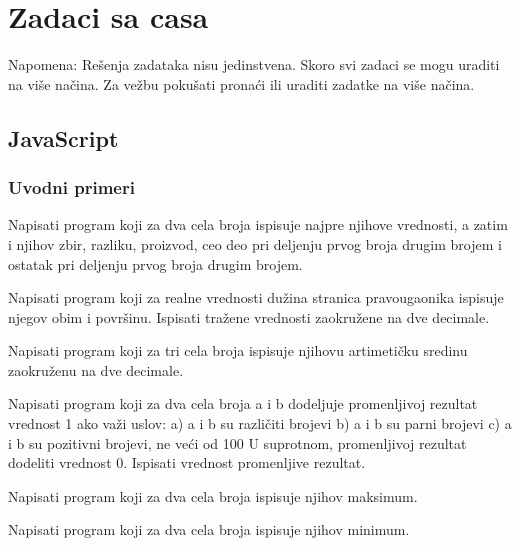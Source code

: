 \section{Zadaci sa casa}
Napomena: Rešenja zadataka nisu jedinstvena. Skoro svi zadaci se mogu uraditi na više načina. Za vežbu pokušati pronaći ili uraditi zadatke na više načina. 

\subsection{JavaScript}

\subsubsection{Uvodni primeri}
\begin{primer}
Napisati program koji za dva cela broja ispisuje najpre
njihove vrednosti, a zatim i njihov zbir, razliku, proizvod, ceo deo pri deljenju
prvog broja drugim brojem i ostatak pri deljenju prvog broja drugim brojem. 
\end{primer}


\begin{primer}
Napisati program koji za realne vrednosti dužina
stranica pravougaonika ispisuje njegov obim i površinu. Ispisati tražene vrednosti
zaokružene na dve decimale. 
\end{primer}

\begin{primer}
Napisati program koji za tri cela broja ispisuje
njihovu artimetičku sredinu zaokruženu na dve decimale.
\end{primer}

\begin{primer}
Napisati program koji za dva cela broja a i b dodeljuje
promenljivoj rezultat vrednost 1 ako važi uslov:
a) a i b su različiti brojevi
b) a i b su parni brojevi
c) a i b su pozitivni brojevi, ne veći od 100
U suprotnom, promenljivoj rezultat dodeliti vrednost 0. Ispisati vrednost promenljive
rezultat.
\end{primer}

\begin{primer}
Napisati program koji za dva cela broja ispisuje
njihov maksimum.
\end{primer}

\begin{primer}
Napisati program koji za dva cela broja ispisuje
njihov minimum.
\end{primer}

